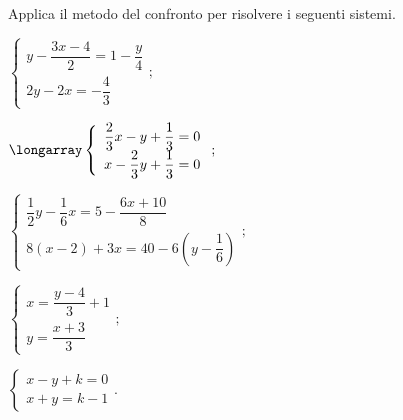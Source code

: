 \begin{esercizio}[\Ast]
 \label{ese:19.18}
Applica il metodo del confronto per risolvere i seguenti sistemi.
 \begin{multicols}{2}
 \begin{enumeratea}
\item $\left\{\begin{array}{l}y-\dfrac{3x-4}{2}=1-\dfrac{y}{4}\\2y-2x=-{\dfrac{4}{3}}\end{array}\right.;$
\item $\longarray\left\{\begin{array}{l}\dfrac{2}{3}x-y+\dfrac{1}{3}=0\\x-\dfrac{2}{3}y+\dfrac{1}{3}=0\end{array}\right.;$
\item $\left\{\begin{array}{l}\dfrac{1}{2}y-\dfrac{1}{6}x=5-\dfrac{6x+10}{8}\\8(x-2)+3x=40-6\left(y-\dfrac{1}{6}\right)\end{array}\right.;$
\item $\left\{\begin{array}{l}x=\dfrac{y-4}{3}+1\\y=\dfrac{x+3}{3}\end{array}\right.;$
\item $\left\{\begin{array}{l}x-y+k=0\\x+y=k-1\end{array}\right..$
 \end{enumeratea}
 \end{multicols}
\end{esercizio}


